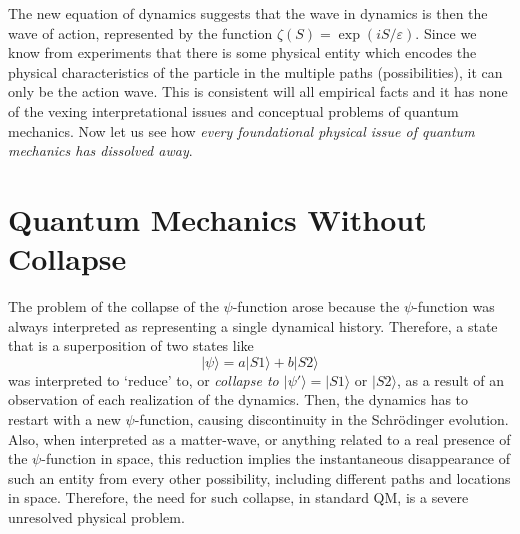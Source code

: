 The new equation of dynamics suggests that the wave in dynamics is then the wave
of action, represented by the function $\zeta (S) = \exp(iS/\varepsilon)$. Since we know from experiments
that there is some physical entity which encodes the physical characteristics of the particle
in the multiple paths (possibilities), it can only be the action wave. This is consistent will
all empirical facts and it has none of the vexing interpretational issues and conceptual problems of quantum mechanics. 
Now let us see how \textit{every foundational physical issue of quantum mechanics has dissolved away}.

\section{Quantum Mechanics Without Collapse}\label{c14-sec5}

The problem of the collapse of the $\psi$-function arose because the $\psi$-function was always
interpreted as representing a single dynamical history. Therefore, a state that is a superposition of two states like
\begin{equation*}
|\psi \rangle = a |S1 \rangle + b |S2 \rangle \tag{27}\label{c14-eq27}
\end{equation*}
was interpreted to  `reduce' to, or \textit{collapse to $|\psi' \rangle = |S1 \rangle$}  or $|S2 \rangle$, as a result of an observation of each realization of the dynamics. Then, the dynamics has to restart with a new $\psi$-function, causing discontinuity
in the Schr\"{o}dinger evolution. Also, when interpreted as a matter-wave, or anything related to a real presence of the $\psi$-function in space, this reduction implies the instantaneous disappearance of such an entity from every other possibility, including different paths and locations in space. 
Therefore, the need for such collapse, in standard QM, is a severe unresolved physical problem.

